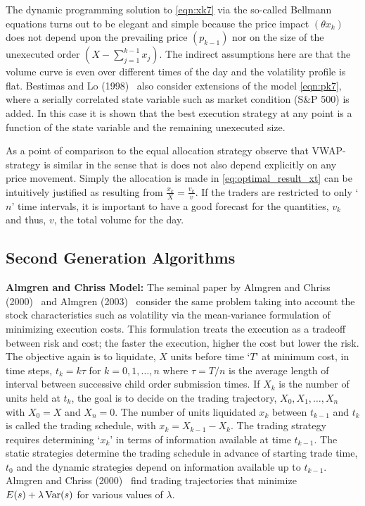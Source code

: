 The dynamic programming solution to \eqref{eqn:xk7} via the so-called Bellmann equations turns out to be elegant and simple because the price impact $(\theta x_k)$ does not depend upon the prevailing price $(p_{k-1})$ nor on the size of the unexecuted order $(X - \sum_{j=1}^{k-1} x_j)$. The indirect assumptions here are that the volume curve is even over different times of the day and the volatility profile is flat. Bestimas and Lo (1998)~\cite{berlo} also consider extensions of the model \eqref{eqn:pk7}, where a serially correlated state variable such as market condition (S\&P 500) is added. In this case it is shown that the best execution strategy at any point is a function of the state variable and the remaining unexecuted size. 


As a point of comparison to the equal allocation strategy observe that VWAP-strategy is similar in the sense that is does not also depend explicitly on any price movement. Simply the allocation is made in \eqref{eq:optimal_result_xt} can be intuitively justified as resulting from $\frac{x_k}{X}= \frac{v_k}{v}$. If the traders are restricted to only `$n$' time intervals, it is important to have a good forecast for the quantities, $v_k$ and thus, $v$, the total volume for the day. 



\subsection{Second Generation Algorithms \label{subsec:almchrmodel}}


\noindent\textbf{Almgren and Chriss Model:} The seminal paper by Almgren and Chriss (2000)~\cite{alm2000} and Almgren (2003)~\cite{almgren2003} consider the same problem taking into account the stock characteristics such as volatility via the mean-variance formulation of minimizing execution costs. This formulation treats the execution as a tradeoff between risk and cost; the faster the execution, higher the cost but lower the risk. The objective again is to liquidate, $X$ units before time `$T$' at minimum cost, in time steps, $t_k = k \tau$ for $k = 0,1,\ldots, n$ where $\tau = T/n$ is the average length of interval between successive child order submission times. If $X_k$ is the number of units held at $t_k$, the goal is to decide on the trading trajectory, $X_0, X_1, \ldots, X_n$ with $X_0=X$ and $X_n=0$. The number of units liquidated $x_k$ between $t_{k-1}$ and $t_k$ is called the trading schedule, with $x_k = X_{k-1} - X_k$. The trading strategy requires determining `$x_k$' in terms of information available at time $t_{k-1}$. The static strategies determine the trading schedule in advance of starting trade time, $t_0$ and the dynamic strategies depend on information available up to $t_{k-1}$. Almgren and Chriss (2000)~\cite{alm2000} find trading trajectories that minimize $E(s)+\lambda \operatorname{Var}(s)$ for various values of $\lambda$.


